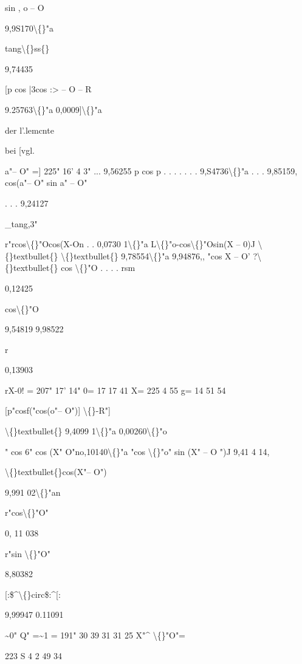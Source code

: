\documentclass[10pt,a4paper]{article}
\begin{document}
sin , o -- O

9,9S170\textbackslash\{\}"a

tang\textbackslash\{\}ss\{\}

9,74435

[p cos |3cos :> -- O
-- R

9.25763\textbackslash\{\}"a
0,0009]\textbackslash\{\}"a

der l'.lemcnte

bei [vgl.

a"-- O" =] 225" 16' 4 3"
... 9,56255
p cos p . . . .
. . . 9,S4736\textbackslash\{\}"a
. . . 9,85159,
cos(a"-- O"
sin a" -- O"

. . . 9,24127

\_tang,3"

r"rcos\textbackslash\{\}"Ocos(X-On . . 0,0730 1\textbackslash\{\}"a
L\textbackslash\{\}"o-cos\textbackslash\{\}"Osin(X -- 0)J \textbackslash\{\}textbullet\{\} \textbackslash\{\}textbullet\{\} 9,78554\textbackslash\{\}"a
9,94876,,
"cos X -- O'
?\textbackslash\{\}textbullet\{\} cos \textbackslash\{\}"O . . . .
rsm

0,12425

cos\textbackslash\{\}"O

9,54819
9,98522

r

0,13903

rX-0! = 207" 17' 14"
0= 17 17 41
X= 225 4 55
g= 14 51 54

[p"cosf("cos(o"-- O")]
\textbackslash\{\}-R"]

\textbackslash\{\}textbullet\{\} 9,4099 1\textbackslash\{\}"a
0,00260\textbackslash\{\}"o

" cos 6" cos (X" O"no,10140\textbackslash\{\}"a
"cos \textbackslash\{\}"o" sin (X" -- O ")J 9,41 4 14,

\textbackslash\{\}textbullet\{\}cos(X"-- O")

9,991 02\textbackslash\{\}"an

r"cos\textbackslash\{\}"O"

0, 11 038

r"sin \textbackslash\{\}"O"

8,80382

[:\$\textasciicircum{}\textbackslash\{\}circ\$:\textasciicircum{}[:

9,99947
0.11091

\textasciitilde{}0"
Q" =\textasciitilde{}1
=
191"
30 39
31 31
25
X"\textasciicircum{}
\textbackslash\{\}"O"=

223
S 4
2 49 34
\end{document}
